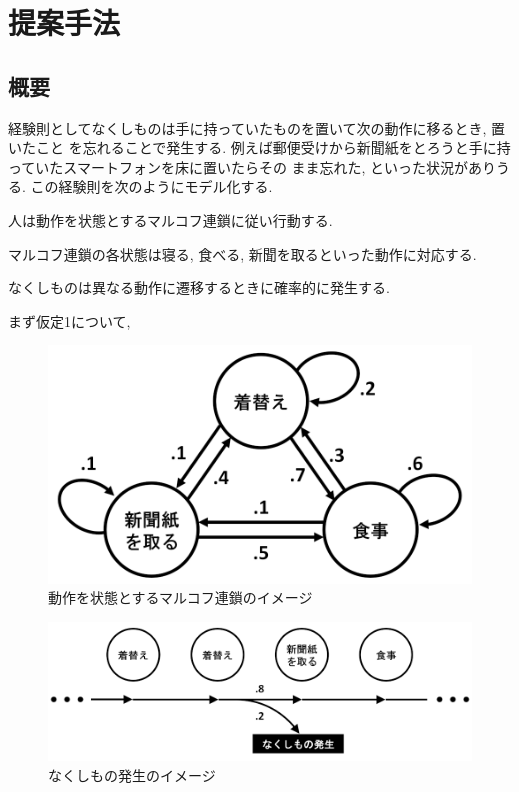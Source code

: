 \chapter{提案手法}\label{chap:method}

\section{概要}
経験則としてなくしものは手に持っていたものを置いて次の動作に移るとき, 置いたこと
を忘れることで発生する.
例えば郵便受けから新聞紙をとろうと手に持っていたスマートフォンを床に置いたらその
まま忘れた, といった状況がありうる.
この経験則を次のようにモデル化する.
\begin{description}
    \item[仮定1]
    人は動作を状態とするマルコフ連鎖に従い行動する.
    \item
    マルコフ連鎖の各状態は寝る, 食べる, 新聞を取るといった動作に対応する.
    \item[仮定2]
    なくしものは異なる動作に遷移するときに確率的に発生する.
\end{description}


まず仮定1について, 
\begin{figure}[H]
    \begin{center}
    \includegraphics[width=0.6\linewidth]{figs/model_1.png}
    \caption{動作を状態とするマルコフ連鎖のイメージ}
    \label{fig:model1}
    \end{center}
\end{figure}

\begin{figure}[H]
    \begin{center}
    \includegraphics[width=0.8\linewidth]{figs/model_2.png}
    \caption{なくしもの発生のイメージ}
    \label{fig:model2}
    \end{center}
\end{figure}


